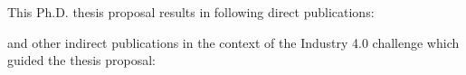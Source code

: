 
This Ph.D. thesis proposal results in following direct publications:


\begin{enumerate_jp}
\item {}
\item {}
\item {}
\end{enumerate_jp}

\vspace{3cm}

\noindent and other indirect publications in the context of the Industry 4.0 challenge which guided the thesis proposal:

\begin{enumerate_jp}
	\item {}
	\item {}
	\item {}
	\item {}
	\item {}
\end{enumerate_jp}